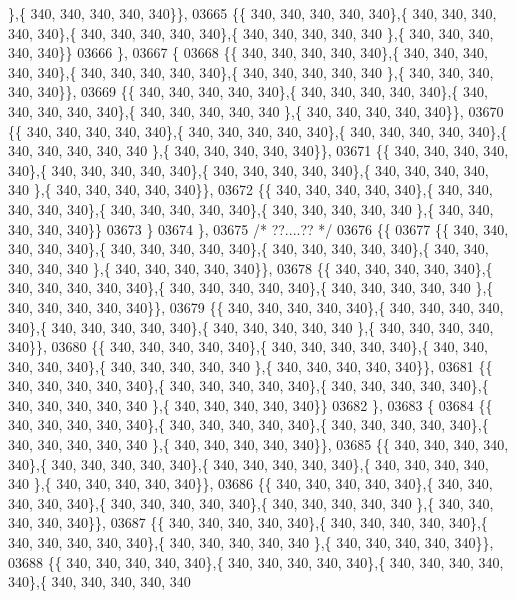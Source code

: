 \begin{DoxyCode}
      \},\{ 340, 340, 340, 340, 340\}\},
03665 \{\{ 340, 340, 340, 340, 340\},\{ 340, 340, 340, 340, 340\},\{ 340, 340, 340, 340, 340\},\{ 340, 340, 340, 340, 340
      \},\{ 340, 340, 340, 340, 340\}\}
03666 \},
03667 \{
03668 \{\{ 340, 340, 340, 340, 340\},\{ 340, 340, 340, 340, 340\},\{ 340, 340, 340, 340, 340\},\{ 340, 340, 340, 340, 340
      \},\{ 340, 340, 340, 340, 340\}\},
03669 \{\{ 340, 340, 340, 340, 340\},\{ 340, 340, 340, 340, 340\},\{ 340, 340, 340, 340, 340\},\{ 340, 340, 340, 340, 340
      \},\{ 340, 340, 340, 340, 340\}\},
03670 \{\{ 340, 340, 340, 340, 340\},\{ 340, 340, 340, 340, 340\},\{ 340, 340, 340, 340, 340\},\{ 340, 340, 340, 340, 340
      \},\{ 340, 340, 340, 340, 340\}\},
03671 \{\{ 340, 340, 340, 340, 340\},\{ 340, 340, 340, 340, 340\},\{ 340, 340, 340, 340, 340\},\{ 340, 340, 340, 340, 340
      \},\{ 340, 340, 340, 340, 340\}\},
03672 \{\{ 340, 340, 340, 340, 340\},\{ 340, 340, 340, 340, 340\},\{ 340, 340, 340, 340, 340\},\{ 340, 340, 340, 340, 340
      \},\{ 340, 340, 340, 340, 340\}\}
03673 \}
03674 \},
03675 \textcolor{comment}{/* ??....?? */}
03676 \{\{
03677 \{\{ 340, 340, 340, 340, 340\},\{ 340, 340, 340, 340, 340\},\{ 340, 340, 340, 340, 340\},\{ 340, 340, 340, 340, 340
      \},\{ 340, 340, 340, 340, 340\}\},
03678 \{\{ 340, 340, 340, 340, 340\},\{ 340, 340, 340, 340, 340\},\{ 340, 340, 340, 340, 340\},\{ 340, 340, 340, 340, 340
      \},\{ 340, 340, 340, 340, 340\}\},
03679 \{\{ 340, 340, 340, 340, 340\},\{ 340, 340, 340, 340, 340\},\{ 340, 340, 340, 340, 340\},\{ 340, 340, 340, 340, 340
      \},\{ 340, 340, 340, 340, 340\}\},
03680 \{\{ 340, 340, 340, 340, 340\},\{ 340, 340, 340, 340, 340\},\{ 340, 340, 340, 340, 340\},\{ 340, 340, 340, 340, 340
      \},\{ 340, 340, 340, 340, 340\}\},
03681 \{\{ 340, 340, 340, 340, 340\},\{ 340, 340, 340, 340, 340\},\{ 340, 340, 340, 340, 340\},\{ 340, 340, 340, 340, 340
      \},\{ 340, 340, 340, 340, 340\}\}
03682 \},
03683 \{
03684 \{\{ 340, 340, 340, 340, 340\},\{ 340, 340, 340, 340, 340\},\{ 340, 340, 340, 340, 340\},\{ 340, 340, 340, 340, 340
      \},\{ 340, 340, 340, 340, 340\}\},
03685 \{\{ 340, 340, 340, 340, 340\},\{ 340, 340, 340, 340, 340\},\{ 340, 340, 340, 340, 340\},\{ 340, 340, 340, 340, 340
      \},\{ 340, 340, 340, 340, 340\}\},
03686 \{\{ 340, 340, 340, 340, 340\},\{ 340, 340, 340, 340, 340\},\{ 340, 340, 340, 340, 340\},\{ 340, 340, 340, 340, 340
      \},\{ 340, 340, 340, 340, 340\}\},
03687 \{\{ 340, 340, 340, 340, 340\},\{ 340, 340, 340, 340, 340\},\{ 340, 340, 340, 340, 340\},\{ 340, 340, 340, 340, 340
      \},\{ 340, 340, 340, 340, 340\}\},
03688 \{\{ 340, 340, 340, 340, 340\},\{ 340, 340, 340, 340, 340\},\{ 340, 340, 340, 340, 340\},\{ 340, 340, 340, 340, 340

\end{DoxyCode}
